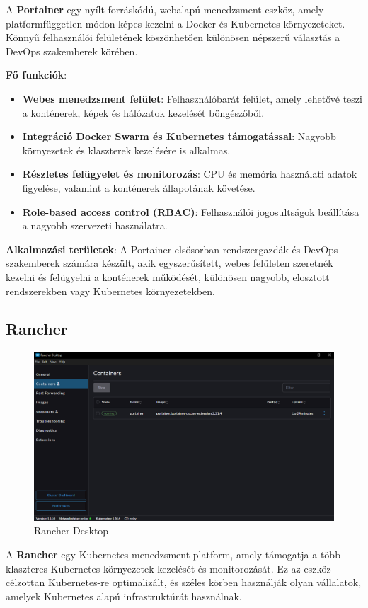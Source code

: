 A \textbf{Portainer} egy nyílt forráskódú, webalapú menedzsment eszköz, amely platformfüggetlen módon képes kezelni a Docker és Kubernetes környezeteket. Könnyű felhasználói felületének köszönhetően különösen népszerű választás a DevOps szakemberek körében.

\textbf{Fő funkciók}:
\begin{itemize}
	\item \textbf{Webes menedzsment felület}: Felhasználóbarát felület, amely lehetővé teszi a konténerek, képek és hálózatok kezelését böngészőből.
	\item \textbf{Integráció Docker Swarm és Kubernetes támogatással}: Nagyobb környezetek és klaszterek kezelésére is alkalmas.
	\item \textbf{Részletes felügyelet és monitorozás}: CPU és memória használati adatok figyelése, valamint a konténerek állapotának követése.
	\item \textbf{Role-based access control (RBAC)}: Felhasználói jogosultságok beállítása a nagyobb szervezeti használatra.
\end{itemize}

\textbf{Alkalmazási területek}:
A Portainer elsősorban rendszergazdák és DevOps szakemberek számára készült, akik egyszerűsített, webes felületen szeretnék kezelni és felügyelni a konténerek működését, különösen nagyobb, elosztott rendszerekben vagy Kubernetes környezetekben.

\subsection{Rancher}

\begin{figure}[H]
	\centering
	\includegraphics[width=0.7\linewidth]{images/rancher}
	\caption{Rancher Desktop}
	\label{fig:rancher}
\end{figure}


A \textbf{Rancher} egy Kubernetes menedzsment platform, amely támogatja a több klaszteres Kubernetes környezetek kezelését és monitorozását. Ez az eszköz célzottan Kubernetes-re optimalizált, és széles körben használják olyan vállalatok, amelyek Kubernetes alapú infrastruktúrát használnak.

